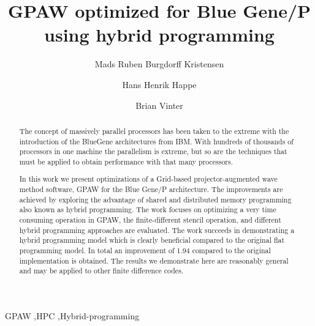 \documentclass[preprint,3p,times,twocolumn]{elsarticle}
\begin{document}
\begin{frontmatter}



\title{GPAW optimized for Blue Gene/P using hybrid programming}


\author{Mads Ruben Burgdorff Kristensen}
\author{Hans Henrik Happe}
\author{Brian Vinter}
\address{eScience Center - University of Copenhagen Denmark}

\begin{abstract}
The concept of massively parallel processors has been taken to the extreme with the introduction of the BlueGene architectures from IBM. With hundreds of thousands of processors in one machine the parallelism is extreme, but so are the techniques that must be applied to obtain performance with that many processors.

In this work we present optimizations of a Grid-based projector-augmented wave method software, GPAW \cite{Mortensen05} for the Blue Gene/P architecture. The improvements are achieved by exploring the advantage of shared and distributed memory programming also known as hybrid programming. The work focuses on optimizing a very time consuming operation in GPAW, the finite-different stencil operation, and different hybrid programming approaches are evaluated. The work succeeds in demonstrating a hybrid programming model which is clearly beneficial compared to the original flat programming model. In total an improvement of 1.94 compared to the original implementation is obtained. The results we demonstrate here are reasonably general and may be applied to other finite difference codes.
\end{abstract}

\begin{keyword}
GPAW \sep HPC \sep Hybrid-programming


\end{keyword}

\end{frontmatter}
\end{document}
